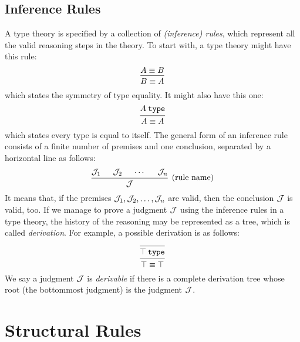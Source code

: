 \documentclass[11pt]{article}
\begin{document}
\subsection{Inference Rules}

A type theory is specified by a collection of \emph{(inference) rules},
which represent all the valid reasoning steps in the theory.
To start with, a type theory might have this rule:
\[
  \begin{prooftree}
    \hypo{\eqtype{A}{B}}
    \infer1{\eqtype{B}{A}}
  \end{prooftree}
\]
which states the symmetry of type equality.
It might also have this one:
\[
  \begin{prooftree}
    \hypo{\istype{A}}
    \infer1{\eqtype{A}{A}}
  \end{prooftree}
\]
which states every type is equal to itself.
The general form of an inference rule consists of a finite number of premises and one conclusion,
separated by a horizontal line as follows:
\[
  \begin{prooftree}
    \hypo{\JJ_1}
    \hypo{\JJ_2}
    \hypo{\cdots}
    \hypo{\JJ_n}
    \infer4[(rule name)]{\JJ}
  \end{prooftree}
\]
It means that, if the premises $\mathcal{J}_1, \mathcal{J}_2, \ldots, \mathcal{J}_n$ are valid, then the conclusion $\mathcal{J}$ is valid, too.
If we manage to prove a judgment $\mathcal{J}$ using the inference rules in a type theory,
the history of the reasoning may be represented as a tree, which is called \emph{derivation}.
For example, a possible derivation is as follows:
\[
  \begin{prooftree}
    \infer0{\istype{\unittype}}
    \infer1{\eqtype{\unittype}{\unittype}}
  \end{prooftree}
\]
We say a judgment $\mathcal{J}$ is \emph{derivable} if there is a complete derivation tree whose root (the bottommost judgment) is the judgment $\mathcal{J}$.

\section{Structural Rules}
\end{document}
